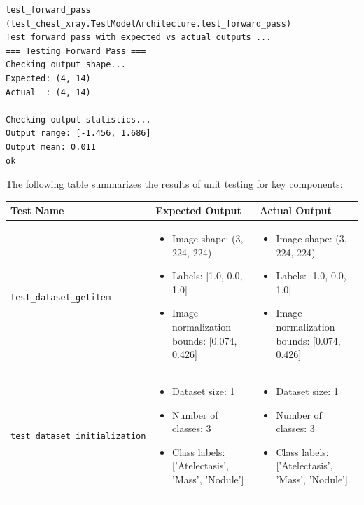 \documentclass[12pt, titlepage]{article}
\begin{document}
\begin{verbatim}
test_forward_pass (test_chest_xray.TestModelArchitecture.test_forward_pass)
Test forward pass with expected vs actual outputs ...
=== Testing Forward Pass ===
Checking output shape...
Expected: (4, 14)
Actual  : (4, 14)

Checking output statistics...
Output range: [-1.456, 1.686]
Output mean: 0.011
ok
\end{verbatim}

\pagebreak
The following table summarizes the results of unit testing for key components:


\begin{table}[h!]
\begin{scriptsize}
\centering
\begin{tabular}{|p{4cm}|p{6cm}|p{6cm}|}
\hline
\textbf{Test Name} & \textbf{Expected Output} & \textbf{Actual Output} \\
\hline
\texttt{test\_dataset\_getitem} & 
\begin{itemize}
    \item Image shape: (3, 224, 224)
    \item Labels: [1.0, 0.0, 1.0]
    \item Image normalization bounds: [0.074, 0.426]
\end{itemize} & 
\begin{itemize}
    \item Image shape: (3, 224, 224)
    \item Labels: [1.0, 0.0, 1.0]
    \item Image normalization bounds: [0.074, 0.426]
\end{itemize} \\
\hline
\texttt{test\_dataset\_initialization} & 
\begin{itemize}
    \item Dataset size: 1
    \item Number of classes: 3
    \item Class labels: ['Atelectasis', 'Mass', 'Nodule']
\end{itemize} & 
\begin{itemize}
    \item Dataset size: 1
    \item Number of classes: 3
    \item Class labels: ['Atelectasis', 'Mass', 'Nodule']
\end{itemize} \\
\hline

\end{tabular}
\end{scriptsize}
\end{table}
\end{document}
